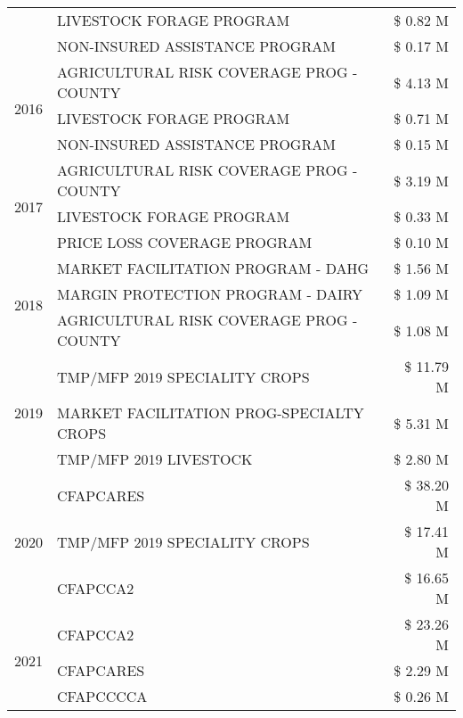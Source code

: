 \begin{tabular}{llr}
 & LIVESTOCK FORAGE PROGRAM & \$ 0.82 M \\
 & NON-INSURED ASSISTANCE PROGRAM & \$ 0.17 M \\
\cline{1-3}
\multirow[t]{3}{*}{2016} & AGRICULTURAL RISK COVERAGE PROG - COUNTY      & \$ 4.13 M \\
 & LIVESTOCK FORAGE PROGRAM                      & \$ 0.71 M \\
 & NON-INSURED ASSISTANCE PROGRAM                & \$ 0.15 M \\
\cline{1-3}
\multirow[t]{3}{*}{2017} & AGRICULTURAL RISK COVERAGE PROG - COUNTY & \$ 3.19 M \\
 & LIVESTOCK FORAGE PROGRAM & \$ 0.33 M \\
 & PRICE LOSS COVERAGE PROGRAM & \$ 0.10 M \\
\cline{1-3}
\multirow[t]{3}{*}{2018} & MARKET FACILITATION PROGRAM - DAHG & \$ 1.56 M \\
 & MARGIN PROTECTION PROGRAM - DAIRY & \$ 1.09 M \\
 & AGRICULTURAL RISK COVERAGE PROG - COUNTY & \$ 1.08 M \\
\cline{1-3}
\multirow[t]{3}{*}{2019} & TMP/MFP 2019 SPECIALITY CROPS & \$ 11.79 M \\
 & MARKET FACILITATION PROG-SPECIALTY CROPS & \$ 5.31 M \\
 & TMP/MFP 2019 LIVESTOCK & \$ 2.80 M \\
\cline{1-3}
\multirow[t]{3}{*}{2020} & CFAPCARES & \$ 38.20 M \\
 & TMP/MFP 2019 SPECIALITY CROPS & \$ 17.41 M \\
 & CFAPCCA2 & \$ 16.65 M \\
\cline{1-3}
\multirow[t]{3}{*}{2021} & CFAPCCA2 & \$ 23.26 M \\
 & CFAPCARES & \$ 2.29 M \\
 & CFAPCCCCA & \$ 0.26 M \\
\cline{1-3}
\bottomrule
\end{tabular}
